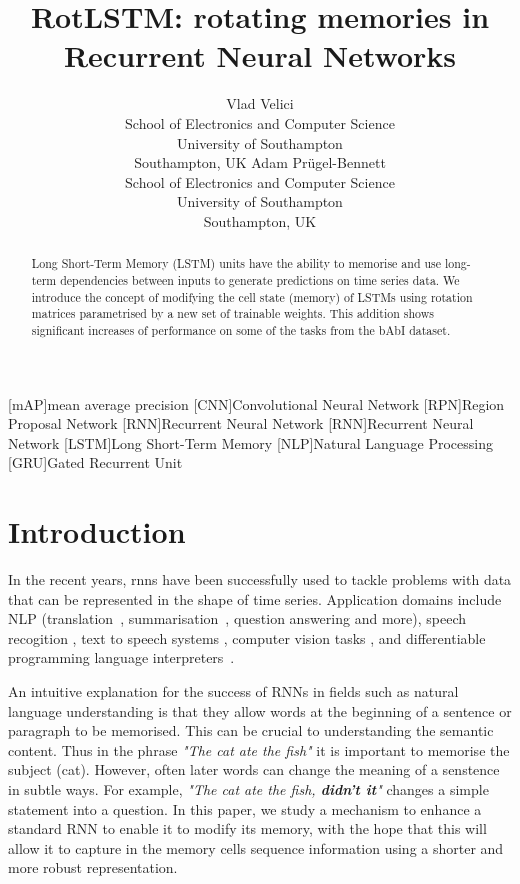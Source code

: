 \documentclass{article}
\title{RotLSTM: rotating memories in Recurrent Neural Networks}
\author{
  Vlad Velici \\
  School of Electronics and Computer Science\\
  University of Southampton\\
  Southampton, UK
  \And
  Adam Pr\"ugel-Bennett \\
  School of Electronics and Computer Science \\
  University of Southampton \\
  Southampton, UK
}
\begin{document}

\maketitle

\begin{abstract}
Long Short-Term Memory (LSTM) units have the ability to memorise and use long-term dependencies between inputs to generate predictions on time series data. We introduce the concept of modifying the cell state (memory) of LSTMs using rotation matrices parametrised by a new set of trainable weights. This addition shows significant increases of performance on some of the tasks from the bAbI dataset.
\end{abstract}

\begin{acronym}
  [mAP]{mean average precision}
  [CNN]{Convolutional Neural Network}
  [RPN]{Region Proposal Network}
  [RNN]{Recurrent Neural Network}
  [RNN]{Recurrent Neural Network}
  [LSTM]{Long Short-Term Memory}
  [NLP]{Natural Language Processing}
  [GRU]{Gated Recurrent Unit}
\end{acronym}


\section{Introduction}
\label{rot:sec:introduction}

In the recent years, \acp{rnn} have been successfully used to tackle problems with data that can be represented in the shape of time series. Application domains include \ac{NLP} (translation~\citep{DBLP:journals/corr/RoscaB16}, summarisation~\citep{DBLP:journals/corr/NallapatiXZ16}, question answering and more), speech recogition \citep{DBLP:journals/corr/HannunCCCDEPSSCN14, graves2013speech}, text to speech systems \citep{arik2017deep}, computer vision tasks \citep{stewart2016end, wu2017visual}, and differentiable programming language interpreters~\citep{riedel2016programming, rocktaschel2017end}.

An intuitive explanation for the success of RNNs in fields such as natural language understanding is that they allow words at the beginning of a sentence or paragraph to be memorised.  This can be crucial to understanding the semantic content.  Thus in the phrase \emph{"The cat ate the fish"} it is important to memorise the subject (cat).  However, often later words can change the meaning of a senstence in subtle ways.  For example, \emph{"The cat ate the fish, \textbf{didn't it}"} changes a simple statement into a question.  In this paper, we study a mechanism to enhance a standard RNN to enable it to modify its memory, with the hope that this will allow it to capture in the memory cells sequence information using a shorter and more robust representation.
\end{document}

